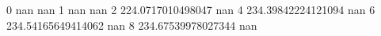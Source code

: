0 nan nan
1 nan nan
2 224.0717010498047 nan
4 234.39842224121094 nan
6 234.54165649414062 nan
8 234.67539978027344 nan
